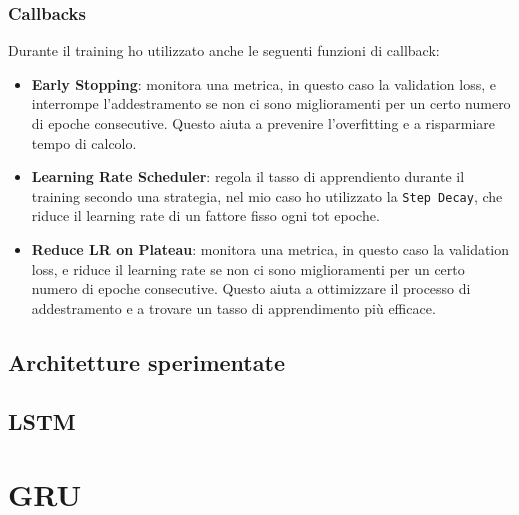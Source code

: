 \subsubsection{Callbacks}
Durante il training ho utilizzato anche le seguenti funzioni di callback:
\begin{itemize}
    \item \textbf{Early Stopping}: monitora una metrica, in questo caso la validation loss, e interrompe l'addestramento se non ci sono miglioramenti per un certo numero di epoche consecutive. Questo aiuta a prevenire l'overfitting e a risparmiare tempo di calcolo.
    \item \textbf{Learning Rate Scheduler}: regola il tasso di apprendiento durante il training secondo una strategia, nel mio caso ho utilizzato la \texttt{Step Decay}, che riduce il learning rate di un fattore fisso ogni tot epoche.
    \item \textbf{Reduce LR on Plateau}: monitora una metrica, in questo caso la validation loss, e riduce il learning rate se non ci sono miglioramenti per un certo numero di epoche consecutive. Questo aiuta a ottimizzare il processo di addestramento e a trovare un tasso di apprendimento più efficace.
\end{itemize}

\subsection{Architetture sperimentate}

\subsection{LSTM}






\section{GRU}
